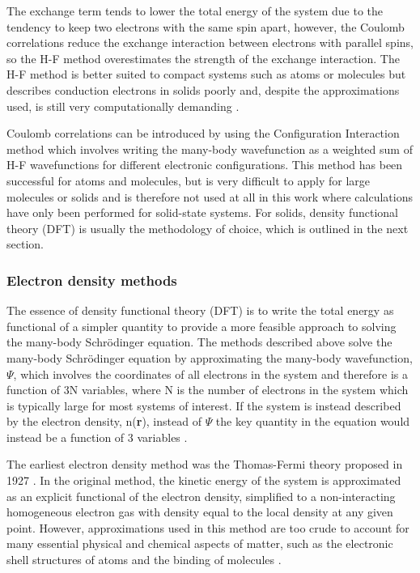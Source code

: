 \documentclass[11pt, twoside]{report}
\begin{document}
The exchange term tends to lower the total energy of the system due to the tendency to keep two electrons with the same spin apart, however, the Coulomb correlations reduce the exchange interaction between electrons with parallel spins, so the H-F method overestimates the strength of the exchange interaction. The H-F method is better suited to compact systems such as atoms or molecules but describes conduction electrons in solids poorly \cite{Prasad_ch2} and, despite the approximations used, is still very computationally demanding \cite{Prasad_ch1}.

Coulomb correlations can be introduced by using the Configuration Interaction method which involves writing the many-body wavefunction as a weighted sum of H-F wavefunctions for different electronic configurations. This method has been successful for atoms and molecules, but is very difficult to apply for large molecules or solids \cite{Prasad_ch2} and is therefore not used at all in this work where calculations have only been performed for solid-state systems. For solids, density functional theory (DFT) is usually the methodology of choice, which is outlined in the next section.


\subsubsection{Electron density methods}

The essence of density functional theory (DFT) is to write the total energy as functional of a simpler quantity to provide a more feasible approach to solving the many-body Schr{\"o}dinger equation. The methods described above solve the many-body Schr{\"o}dinger equation by approximating the many-body wavefunction, $\Psi$, which involves the coordinates of all electrons in the system and therefore is a function of 3N variables, where N is the number of electrons in the system which is typically large for most systems of interest. If the system is instead described by the electron density, n(\textbf{r}), instead of $\Psi$ the key quantity in the equation would instead be a function of 3 variables \cite{Prasad_ch3}.

The earliest electron density method was the Thomas-Fermi theory proposed in 1927 \cite{Thomas-Fermi_1, Thomas-Fermi_2}. In the original method, the kinetic energy of the system is approximated as an explicit functional of the electron density, simplified to a non-interacting homogeneous electron gas with density equal to the local density at any given point.
However, approximations used in this method are too crude to account for many essential physical and chemical aspects of matter, such as the electronic shell structures of atoms and the binding of molecules \cite{RichardMartin_Ch6}.
\end{document}
